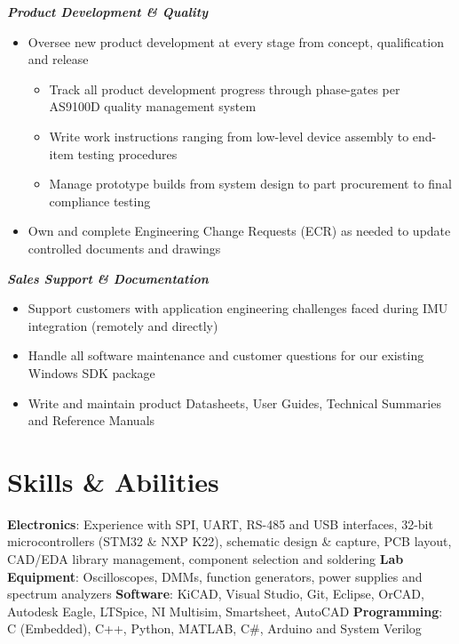 \documentclass[]{article}
\begin{document}
\begin{singlespace}
\noindent\textbf{\emph{Product Development \& Quality}}
\vspace{-2mm}
\begin{itemize}
    \setlength\itemsep{0em}
    \item Oversee new product development at every stage from concept, qualification and release
    \vspace{-2mm}
    \begin{itemize}
        \setlength\itemsep{0em}
        \item Track all product development progress through phase-gates per AS9100D quality management system
        \item Write work instructions ranging from low-level device assembly to end-item testing procedures
        \item Manage prototype builds from system design to part procurement to final compliance testing 
    \end{itemize}

    \vspace{-1mm}
    \item Own and complete Engineering Change Requests (ECR) as needed to update controlled documents and drawings

\end{itemize}

\noindent\textbf{\emph{Sales Support \& Documentation}}
\vspace{-2mm}
\begin{itemize}
    \setlength\itemsep{0em}
    \item Support customers with application engineering challenges faced during IMU integration (remotely and directly)
    \item Handle all software maintenance and customer questions for our existing Windows SDK package 
    \item Write and maintain product Datasheets, User Guides, Technical Summaries and Reference Manuals 
\end{itemize}

\section*{Skills \& Abilities}

\textbf{Electronics}: Experience with SPI, UART, RS-485 and USB interfaces, 32-bit microcontrollers (STM32 \& NXP K22), schematic design \& capture, PCB layout,
CAD/EDA library management, component selection and soldering
\newline\textbf{Lab Equipment}: Oscilloscopes, DMMs, function generators, power supplies and spectrum analyzers
\newline\textbf{Software}: KiCAD, Visual Studio, Git, Eclipse, OrCAD, Autodesk Eagle, LTSpice, NI Multisim, Smartsheet, AutoCAD
\newline\textbf{Programming}: C (Embedded), C++, Python, MATLAB, C\#, Arduino and System Verilog



\end{singlespace}
\end{document}
